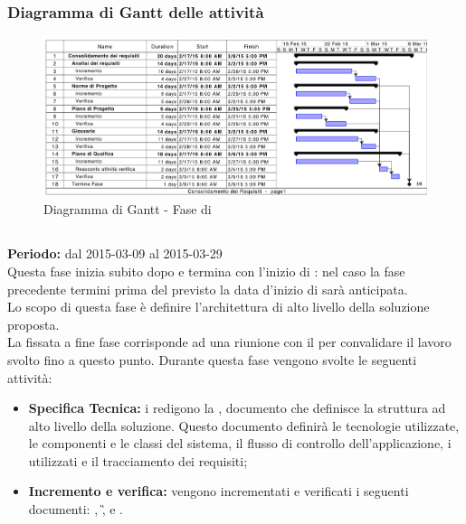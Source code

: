 \subsubsection{Diagramma di Gantt delle attività}
\begin{figure}[h]
\centering
\includegraphics[width=\textwidth,keepaspectratio]{../immagini/gantt/consolidamentoRequisitiP.png}
\caption{Diagramma di Gantt - Fase di \fADt}\label{fig:ganttFAD}
\end{figure}
\FloatBarrier
\subsection{\fPAt}\label{pAr}
\textbf{Periodo:} dal 2015-03-09 al 2015-03-29 \\
Questa fase inizia subito dopo \fAD e termina con l'inizio di \fPD: nel caso la fase precedente termini prima del previsto la data d'inizio di \fAD sarà anticipata.\\
Lo scopo di questa fase è definire l'architettura di alto livello della soluzione proposta. \\
La  fissata a fine fase corrisponde ad una riunione con il  per convalidare il lavoro svolto fino a questo punto.
Durante questa fase vengono svolte le seguenti attività:
\begin{itemize}
\item \textbf{Specifica Tecnica:} i \rPs redigono la \ST, documento che definisce la struttura ad alto livello della soluzione.
Questo documento definirà le tecnologie utilizzate, le componenti e le classi del sistema, il flusso di controllo dell'applicazione, i  utilizzati e il tracciamento dei requisiti;
\item \textbf{Incremento e verifica:} vengono incrementati e verificati i seguenti documenti: \NP, \G, \PP e \PQ.
\end{itemize}
\newpage
